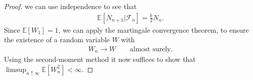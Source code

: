 \documentclass{article}
\newcommand{\N}{\mathbb{N}}
\theoremstyle{definition}
\newcommand{\1}{\mathbbm{1}}
\newcommand{\E}{\mathbb{E}}
\newcommand{\0}{\mathbf{o}}
\newcommand*{\be}{\begin{equation}}
\newcommand*{\ee}{\end{equation}}
\newcommand*{\ba}{\begin{aligned}}
\newcommand*{\ea}{\end{aligned}}
\newcommand{\basc}[1]{{\color{blue}{ \bf [~Bas:\ }\emph{#1}\textbf{~]}}}
\begin{document}
\begin{proof}

we can use independence to see that 
\begin{align*}
\E[N_{n+1}|\mathcal F_n]=\frac{k}{2}N_n.
\end{align*}
Since $\E[W_1]=1$, we can apply the martingale convergence theorem, to ensure the existence of a random variable $W$ with 
\begin{align*}
W_n\to W\qquad \text{almost surely}.
\end{align*}
Using the second-moment method it now suffices to show that $\limsup_{n\uparrow\infty}\E[W_n^2]<\infty$.


\end{proof}
\end{document}
